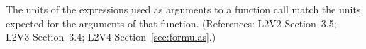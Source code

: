 The units of the expressions used as arguments to a function call
 match the units expected for the arguments of that function.
(References: L2V2 Section~3.5; L2V3 Section~3.4; L2V4 Section~\ref{sec:formulas}.)
